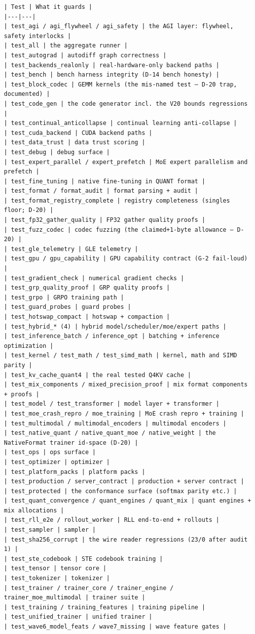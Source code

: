 \begin{Verbatim}[breaklines,breakanywhere,fontsize=\footnotesize]
| Test | What it guards |
|---|---|
| test_agi / agi_flywheel / agi_safety | the AGI layer: flywheel, safety interlocks |
| test_all | the aggregate runner |
| test_autograd | autodiff graph correctness |
| test_backends_realonly | real-hardware-only backend paths |
| test_bench | bench harness integrity (D-14 bench honesty) |
| test_block_codec | GEMM kernels (the mis-named test — D-20 trap, documented) |
| test_code_gen | the code generator incl. the V20 bounds regressions |
| test_continual_anticollapse | continual learning anti-collapse |
| test_cuda_backend | CUDA backend paths |
| test_data_trust | data trust scoring |
| test_debug | debug surface |
| test_expert_parallel / expert_prefetch | MoE expert parallelism and prefetch |
| test_fine_tuning | native fine-tuning in QUANT format |
| test_format / format_audit | format parsing + audit |
| test_format_registry_complete | registry completeness (singles floor; D-20) |
| test_fp32_gather_quality | FP32 gather quality proofs |
| test_fuzz_codec | codec fuzzing (the claimed+1-byte allowance — D-20) |
| test_gle_telemetry | GLE telemetry |
| test_gpu / gpu_capability | GPU capability contract (G-2 fail-loud) |
| test_gradient_check | numerical gradient checks |
| test_grp_quality_proof | GRP quality proofs |
| test_grpo | GRPO training path |
| test_guard_probes | guard probes |
| test_hotswap_compact | hotswap + compaction |
| test_hybrid_* (4) | hybrid model/scheduler/moe/expert paths |
| test_inference_batch / inference_opt | batching + inference optimization |
| test_kernel / test_math / test_simd_math | kernel, math and SIMD parity |
| test_kv_cache_quant4 | the real tested Q4KV cache |
| test_mix_components / mixed_precision_proof | mix format components + proofs |
| test_model / test_transformer | model layer + transformer |
| test_moe_crash_repro / moe_training | MoE crash repro + training |
| test_multimodal / multimodal_encoders | multimodal encoders |
| test_native_quant / native_quant_moe / native_weight | the NativeFormat trainer id-space (D-20) |
| test_ops | ops surface |
| test_optimizer | optimizer |
| test_platform_packs | platform packs |
| test_production / server_contract | production + server contract |
| test_protected | the conformance surface (softmax parity etc.) |
| test_quant_convergence / quant_engines / quant_mix | quant engines + mix allocations |
| test_rll_e2e / rollout_worker | RLL end-to-end + rollouts |
| test_sampler | sampler |
| test_sha256_corrupt | the wire reader regressions (23/0 after audit 1) |
| test_ste_codebook | STE codebook training |
| test_tensor | tensor core |
| test_tokenizer | tokenizer |
| test_trainer / trainer_core / trainer_engine / trainer_moe_multimodal | trainer suite |
| test_training / training_features | training pipeline |
| test_unified_trainer | unified trainer |
| test_wave6_model_feats / wave7_missing | wave feature gates |


\end{Verbatim}
